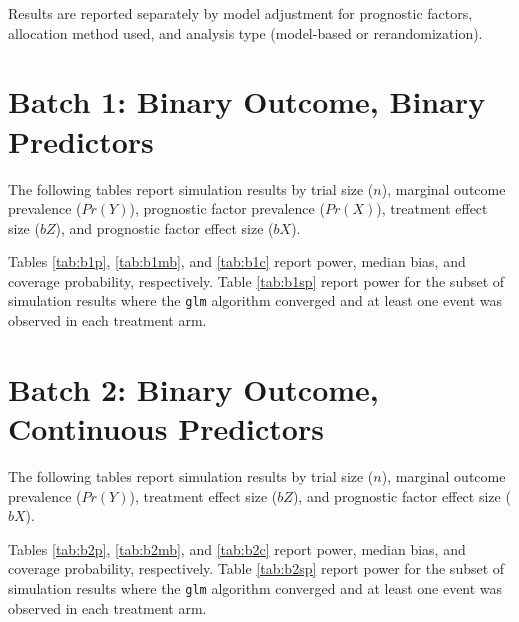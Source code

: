 
Results are reported separately by model adjustment for prognostic factors, allocation method used, and analysis type (model-based or rerandomization).

\section[Binary Y, binary X]{Batch 1: Binary Outcome, Binary Predictors}

The following tables report simulation results by trial size ($n$), marginal outcome prevalence ($Pr( Y )$), prognostic factor prevalence ($Pr( X )$), treatment effect size ($bZ$), and prognostic factor effect size ($bX$).

Tables \ref{tab:b1p}, \ref{tab:b1mb}, and \ref{tab:b1c} report power, median bias, and coverage probability, respectively. Table \ref{tab:b1sp} report power for the subset of simulation results where the \texttt{glm} algorithm converged and at least one event was observed in each treatment arm.

 \newpage 
 \newpage
 \newpage

 \newpage 


\section[Binary Y, continuous X]{Batch 2: Binary Outcome, Continuous Predictors}

The following tables report simulation results by trial size ($n$), marginal outcome prevalence ($Pr( Y )$), treatment effect size ($bZ$), and prognostic factor effect size ($bX$).

Tables \ref{tab:b2p}, \ref{tab:b2mb}, and \ref{tab:b2c} report power, median bias, and coverage probability, respectively. Table \ref{tab:b2sp} report power for the subset of simulation results where the \texttt{glm} algorithm converged and at least one event was observed in each treatment arm.

 \newpage 
 \newpage
 \newpage

 \newpage 


